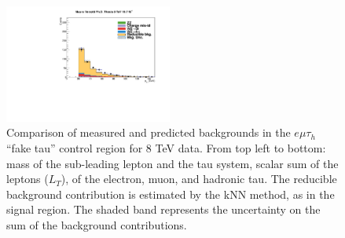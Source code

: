 \begin{figure}
\begin{center}
  \includegraphics[width=0.49\textwidth]{4_Analisys/pics/8TeV/plots/emt/f3/Full/final-f3-tPt-Full.pdf}
  \caption{Comparison of measured and predicted backgrounds in the $e\mu\tau_h$ ``fake tau'' control region for 8 TeV data.
  From top left to bottom: mass of the sub-leading lepton and the tau system, scalar sum of the leptons \pT ($L_T$), \pT of the electron, muon, and hadronic tau.
  The reducible background contribution is estimated by the kNN method, as in the signal region.
  The shaded band represents the uncertainty on the sum of the background contributions.
  }
  \label{fig:LLT_emt_f3_control_8TeV}
\end{center}
\end{figure}


